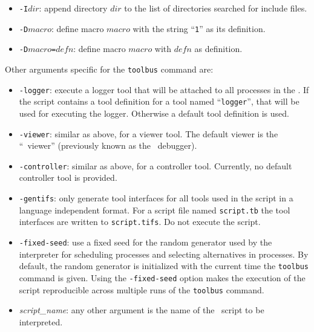 \begin{itemize}

\item {\tt -I$dir$}: append directory $dir$ to the list of directories
searched for include files.

\item {\tt -D$macro$}: define macro $macro$ with the string ``{\tt 1}'' as
its definition.

\item {\tt -D$macro$=$defn$}: define macro $macro$ with $defn$
as definition.

\end{itemize}

\noindent Other arguments specific for the {\tt toolbus} command are:
\begin{itemize}
\item {\tt -logger}: execute a logger tool that will be attached to all
processes in the \TB.
If the script contains a tool definition for a tool named ``{\tt logger}'',
that will be used for executing the logger. Otherwise a default tool definition
is used.
\item {\tt -viewer}: similar as above, for a viewer tool.
The default viewer is the ``\TB\ viewer'' (previously known
as the \TB\ debugger).

\item {\tt -controller}: similar as above, for a controller tool.
Currently, no default controller tool is provided.

\item {\tt -gentifs}: only generate tool interfaces 
for all tools used in the script
in a language independent format. For a script file named {\tt script.tb}
the tool interfaces are written to {\tt script.tifs}.
Do not execute the script.

\item {\tt -fixed-seed}: use a fixed seed for the random generator
used by the interpreter for scheduling processes and selecting
alternatives in processes.  By default, the random generator is
initialized with the current time the {\tt toolbus} command is given.
Using the {\tt -fixed-seed} option makes the execution of the script
reproducible across multiple runs of the {\tt toolbus} command.

\item {\em script\_name}: any other argument is the name of the
\TB\ script to be interpreted.
\end{itemize}


